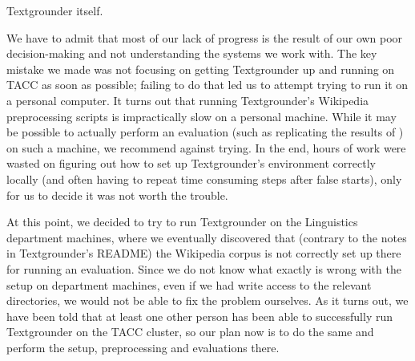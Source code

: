 Textgrounder itself.
\par
We have to admit that most of our lack of progress is the result of our own
poor decision-making and not understanding the systems we work with.
The key mistake we made was not focusing on getting Textgrounder up and running
on TACC as soon as possible; failing to do that led us to
attempt trying to run it on a personal computer.
It turns out that running Textgrounder's Wikipedia preprocessing scripts is
impractically slow on a personal machine. While it may be possible to actually
perform an evaluation (such as replicating the results of )
on such a machine, we recommend against trying.
In the end, hours of work were wasted on figuring out how to set up
Textgrounder's environment correctly locally (and often having to repeat time consuming
steps after false starts), only for us to decide it was not worth the trouble.
\par
At this point, we decided to try to run Textgrounder on the Linguistics
department machines, where we eventually discovered that (contrary to the notes
in Textgrounder's README) the Wikipedia corpus is not correctly set up
there for running an evaluation.
Since we do not know what exactly is wrong with the setup on department machines, even if we had write
access to the relevant directories, we would not be able to fix the problem
ourselves.
As it turns out, we have been told that at least one other person
has been able to successfully run Textgrounder on the TACC cluster, so our plan
now is to do the same and perform the setup, preprocessing and evaluations there.
